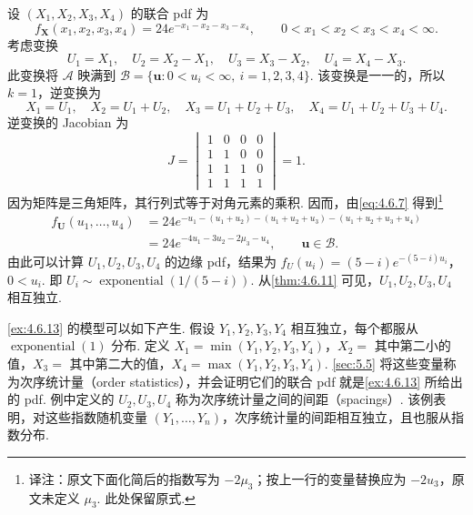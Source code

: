 \begin{example}[多元变量替换]\label{ex:4.6.13}
设 $(X_1,X_2,X_3,X_4)$ 的联合 pdf 为
$$f_{\mathbf X}(x_1,x_2,x_3,x_4)=24e^{-x_1-x_2-x_3-x_4},\qquad0<x_1<x_2<x_3<x_4<\infty.$$
考虑变换
$$U_1=X_1,\quad U_2=X_2-X_1,\quad U_3=X_3-X_2,\quad U_4=X_4-X_3.$$
此变换将 $\mathscr A$ 映满到 $\mathscr B=\{\mathbf u:0<u_i<\infty,\ i=1,2,3,4\}$. 该变换是一一的，所以 $k=1$，逆变换为
$$X_1=U_1,\quad X_2=U_1+U_2,\quad X_3=U_1+U_2+U_3,\quad X_4=U_1+U_2+U_3+U_4.$$
逆变换的 Jacobian 为
$$J=\begin{vmatrix}1&0&0&0\\1&1&0&0\\1&1&1&0\\1&1&1&1\end{vmatrix}=1.$$
因为矩阵是三角矩阵，其行列式等于对角元素的乘积. 因而，由\eqref{eq:4.6.7} 得到\footnote{译注：原文下面化简后的指数写为 $-2\mu_3$；按上一行的变量替换应为 $-2u_3$，原文未定义 $\mu_3$. 此处保留原式.}
$$\begin{aligned}
f_{\mathbf U}(u_1,\ldots,u_4)&=24e^{-u_1-(u_1+u_2)-(u_1+u_2+u_3)-(u_1+u_2+u_3+u_4)}\\
&=24e^{-4u_1-3u_2-2\mu_3-u_4},\qquad\mathbf u\in\mathscr B.
\end{aligned}$$
由此可以计算 $U_1,U_2,U_3,U_4$ 的边缘 pdf，结果为 $f_U(u_i)=(5-i)e^{-(5-i)u_i}$，$0<u_i$. 即 $U_i\sim\operatorname{exponential}(1/(5-i))$. 从\autoref{thm:4.6.11} 可见，$U_1,U_2,U_3,U_4$ 相互独立.
\end{example}
\autoref{ex:4.6.13} 的模型可以如下产生. 假设 $Y_1,Y_2,Y_3,Y_4$ 相互独立，每个都服从 $\operatorname{exponential}(1)$ 分布. 定义 $X_1=\min(Y_1,Y_2,Y_3,Y_4)$，$X_2=$ 其中第二小的值，$X_3=$ 其中第二大的值，$X_4=\max(Y_1,Y_2,Y_3,Y_4)$. \autoref{sec:5.5} 将这些变量称为次序统计量（order statistics），并会证明它们的联合 pdf 就是\autoref{ex:4.6.13} 所给出的 pdf. 例中定义的 $U_2,U_3,U_4$ 称为次序统计量之间的间距（spacings）. 该例表明，对这些指数随机变量 $(Y_1,\ldots,Y_n)$，次序统计量的间距相互独立，且也服从指数分布.
